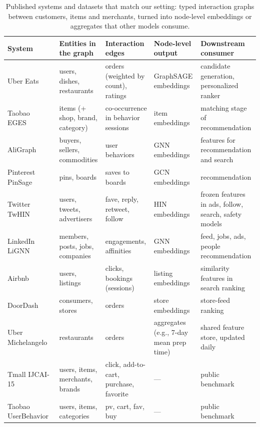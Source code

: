 \documentclass[10pt,twocolumn,letterpaper]{article}
\theoremstyle{definition}
\begin{document}
\begin{table}[t]
\centering\footnotesize
\setlength{\tabcolsep}{4pt}
\renewcommand{\arraystretch}{1.1}
\begin{tabular}{@{}>{\raggedright}p{1.1in}>{\raggedright}p{1.3in}>{\raggedright}p{1.5in}>{\raggedright}p{1.2in}>{\raggedright\arraybackslash}p{1.4in}@{}}
\toprule
System & Entities in the graph & Interaction edges & Node-level output & Downstream consumer \\
\midrule
Uber Eats~\citep{sarda2019ubereats} & users, dishes, restaurants & orders (weighted by count), ratings & GraphSAGE embeddings & candidate generation, personalized ranker \\
Taobao EGES~\citep{wang2018billion} & items (+ shop, brand, category) & co-occurrence in behavior sessions & item embeddings & matching stage of recommendation \\
AliGraph~\citep{zhu2019aligraph} & buyers, sellers, commodities & user behaviors & GNN embeddings & features for recommendation and search \\
Pinterest PinSage~\citep{ying2018graph} & pins, boards & saves to boards & GCN embeddings & recommendation \\
Twitter TwHIN~\citep{elkishky2022twhin} & users, tweets, advertisers & fave, reply, retweet, follow & HIN embeddings & frozen features in ads, follow, search, safety models \\
LinkedIn LiGNN~\citep{borisyuk2024lignn} & members, posts, jobs, companies & engagements, affinities & GNN embeddings & feed, jobs, ads, people recommendation \\
Airbnb~\citep{grbovic2018real} & users, listings & clicks, bookings (sessions) & listing embeddings & similarity features in search ranking \\
DoorDash~\citep{koch2018doordash} & consumers, stores & orders & store embeddings & store-feed ranking \\
Uber Michelangelo~\citep{hermann2017michelangelo} & restaurants & orders & aggregates (e.g., 7-day mean prep time) & shared feature store, updated daily \\
\midrule
Tmall IJCAI-15~\citep{tmall2015} & users, items, merchants, brands & click, add-to-cart, purchase, favorite & --- & public benchmark \\
Taobao UserBehavior~\citep{taobao2018} & users, items, categories & pv, cart, fav, buy & --- & public benchmark \\
\bottomrule
\end{tabular}
\caption{Published systems and datasets that match our setting: typed interaction graphs between customers, items and merchants, turned into node-level embeddings or aggregates that other models consume.}
\label{tab:practice}
\end{table}
\end{document}
